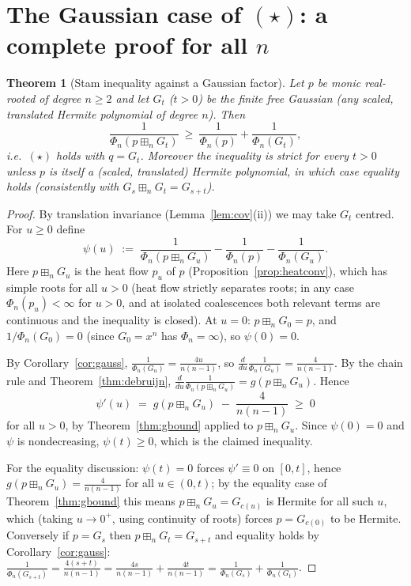 \documentclass[12pt]{article}
\newtheorem{theorem}{Theorem}
\theoremstyle{remark}
\newcommand{\boxp}{\boxplus_n}
\begin{document}
\section{The Gaussian case of $(\star)$: a complete proof for all $n$}\label{sec:gaussstar}

\begin{theorem}[Stam inequality against a Gaussian factor]\label{thm:gausscase}
Let $p$ be monic real-rooted of degree $n\ge2$ and let $G_t$ ($t>0$) be the
finite free Gaussian (any scaled, translated Hermite polynomial of degree $n$).
Then
\[
\frac{1}{\Phi_n(p\boxp G_t)}\ \ge\ \frac{1}{\Phi_n(p)}+\frac{1}{\Phi_n(G_t)},
\]
i.e.\ $(\star)$ holds with $q=G_t$.  Moreover the inequality is strict for every
$t>0$ unless $p$ is itself a (scaled, translated) Hermite polynomial, in which
case equality holds (consistently with $G_s\boxp G_t=G_{s+t}$).
\end{theorem}

\begin{proof}
By translation invariance (Lemma~\ref{lem:cov}(ii)) we may take $G_t$ centred.
For $u\ge0$ define
\[
\psi(u)\;:=\;\frac{1}{\Phi_n(p\boxp G_u)}-\frac{1}{\Phi_n(p)}-\frac{1}{\Phi_n(G_u)} .
\]
Here $p\boxp G_u$ is the heat flow $p_u$ of $p$ (Proposition~\ref{prop:heatconv}),
which has simple roots for all $u>0$ (heat flow strictly separates roots; in any
case $\Phi_n(p_u)<\infty$ for $u>0$, and at isolated coalescences both relevant
terms are continuous and the inequality is closed).  At $u=0$:
$p\boxp G_0=p$, and $1/\Phi_n(G_0)=0$ (since $G_0=x^n$ has $\Phi_n=\infty$),
so $\psi(0)=0$.

By Corollary~\ref{cor:gauss}, $\frac{1}{\Phi_n(G_u)}=\frac{4u}{n(n-1)}$, so
$\frac{d}{du}\frac{1}{\Phi_n(G_u)}=\frac{4}{n(n-1)}$.  By the chain rule and
Theorem~\ref{thm:debruijn},
$\frac{d}{du}\frac{1}{\Phi_n(p\boxp G_u)}=g(p\boxp G_u)$.  Hence
\[
\psi'(u)\;=\;g(p\boxp G_u)\;-\;\frac{4}{n(n-1)}\;\ge\;0
\]
for all $u>0$, by Theorem~\ref{thm:gbound} applied to $p\boxp G_u$.  Since
$\psi(0)=0$ and $\psi$ is nondecreasing, $\psi(t)\ge0$, which is the claimed
inequality.

For the equality discussion: $\psi(t)=0$ forces $\psi'\equiv0$ on $[0,t]$,
hence $g(p\boxp G_u)=\frac{4}{n(n-1)}$ for all $u\in(0,t)$; by the equality
case of Theorem~\ref{thm:gbound} this means $p\boxp G_u=G_{c(u)}$ is Hermite
for all such $u$, which (taking $u\to0^+$, using continuity of roots) forces
$p=G_{c(0)}$ to be Hermite.  Conversely if $p=G_s$ then
$p\boxp G_t=G_{s+t}$ and equality holds by Corollary~\ref{cor:gauss}:
$\frac1{\Phi_n(G_{s+t})}=\frac{4(s+t)}{n(n-1)}=\frac{4s}{n(n-1)}+\frac{4t}{n(n-1)}
=\frac1{\Phi_n(G_s)}+\frac1{\Phi_n(G_t)}$.
\end{proof}
\end{document}
